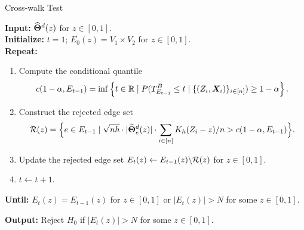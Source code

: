\documentclass[11pt]{article}
\begin{document}
\begin{algorithm}[ht]
\caption{\label{al:cross-walk} Cross-walk Test}
\textbf{Input:} $\widehat{\bm{\Theta}}^d(z)$ for $z\in [0,1]$.  \\
\textbf{Initialize:} $t=1$; $E_0 (z) = V_1 \times V_2$ for $z\in [0,1]$.  \\
\textbf{Repeat:} 
\begin{enumerate}
\item Compute the conditional  quantile 
\[
c(1-\alpha, E_{t-1}) =  \inf \left\{ t\in \mathbb{R}   \mid P(T^B_{E_{t-1}}  \le t \mid \{(Z_i,\bm{X}_i)\}_{i\in[n]})   \ge 1-\alpha     \right\}.
\]

\item Construct the rejected edge set 
\[
\mathcal{R}(z)= \Big\{e\in E_{t-1} \mid \sqrt{nh} \cdot |\widehat{\bm{\Theta}}_e^d (z)| \cdot \sum_{i\in [n]} K_h(Z_i-z)/n > c (1-\alpha,E_{t-1}) \Big\}.
\]

\item Update the rejected edge set $E_t (z) \gets E_{t-1}(z) \backslash \mathcal{R}(z)$ for $z\in [0,1]$.
\item $t \gets t+1$.
\end{enumerate}
\textbf{Until:} $E_t(z)=E_{t-1}(z)$ for $z\in [0,1]$ or $|E_t(z)| > N$ for some $z \in [0,1]$.

\textbf{Output:} Reject $H_0$ if $|E_t(z)| > N$ for some $z \in [0,1]$.
\end{algorithm}

\clearpage
\end{document}
